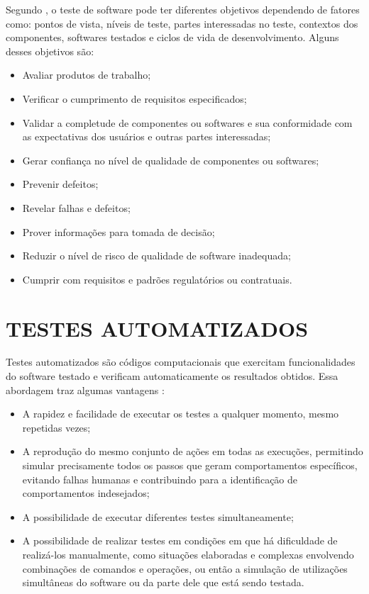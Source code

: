 Segundo , o teste de software pode ter diferentes objetivos dependendo de fatores como: pontos de vista, níveis de teste, partes interessadas no teste, contextos dos componentes, softwares testados e ciclos de vida de desenvolvimento. Alguns desses objetivos são:

\begin{itemize}
    \item Avaliar produtos de trabalho;
    \item Verificar o cumprimento de requisitos especificados;
    \item Validar a completude de componentes ou softwares e sua conformidade com as expectativas dos usuários e outras partes interessadas;
    \item Gerar confiança no nível de qualidade de componentes ou softwares;
    \item Prevenir defeitos;
    \item Revelar falhas e defeitos;
    \item Prover informações para tomada de decisão;
    \item Reduzir o nível de risco de qualidade de software inadequada;
    \item Cumprir com requisitos e padrões regulatórios ou contratuais.
\end{itemize}

    \section{TESTES AUTOMATIZADOS}
    
    Testes automatizados são códigos computacionais que exercitam funcionalidades do software testado e verificam automaticamente os resultados obtidos. Essa abordagem traz algumas vantagens \cite{bernardo2008}:
    
    \begin{itemize}
        \item A rapidez e facilidade de executar os testes a qualquer momento, mesmo repetidas vezes;
        \item A reprodução do mesmo conjunto de ações em todas as execuções, permitindo simular precisamente todos os passos que geram comportamentos específicos, evitando falhas humanas e contribuindo para a identificação de comportamentos indesejados;
        \item A possibilidade de executar diferentes testes simultaneamente;
        \item A possibilidade de realizar testes em condições em que há dificuldade de realizá-los manualmente, como situações elaboradas e complexas envolvendo combinações de comandos e operações, ou então a simulação de utilizações simultâneas do software ou da parte dele que está sendo testada.
    \end{itemize}

